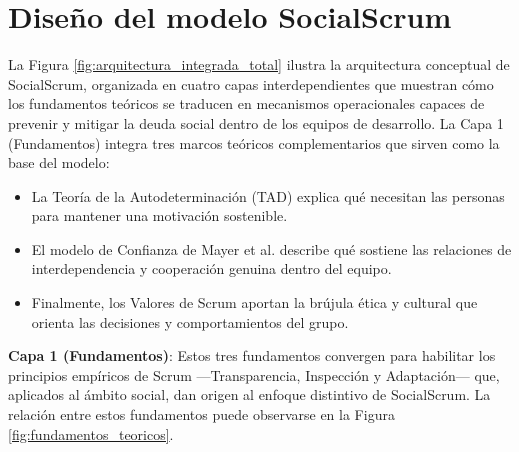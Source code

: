 \FloatBarrier

\section{Diseño del modelo SocialScrum}

La Figura \ref{fig:arquitectura_integrada_total} ilustra la arquitectura conceptual de SocialScrum, organizada en cuatro capas interdependientes que muestran cómo los fundamentos teóricos se traducen en mecanismos operacionales capaces de prevenir y mitigar la deuda social dentro de los equipos de desarrollo.
La Capa 1 (Fundamentos) integra tres marcos teóricos complementarios que sirven como la base del modelo:

\begin{itemize}
    \item La Teoría de la Autodeterminación (TAD) explica qué necesitan las personas para mantener una motivación sostenible.
    \item El modelo de Confianza de Mayer et al. describe qué sostiene las relaciones de interdependencia y cooperación genuina dentro del equipo.
    \item Finalmente, los Valores de Scrum aportan la brújula ética y cultural que orienta las decisiones y comportamientos del grupo.
\end{itemize}

\textbf{Capa 1 (Fundamentos)}: Estos tres fundamentos convergen para habilitar los principios empíricos de Scrum —Transparencia, Inspección y Adaptación— que, aplicados al ámbito social, dan origen al enfoque distintivo de SocialScrum.
La relación entre estos fundamentos puede observarse en la Figura \ref{fig:fundamentos_teoricos}.

